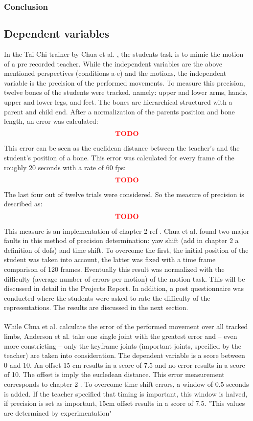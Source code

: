 \subsubsection{Conclusion}

\subsection{Dependent variables}
In the Tai Chi trainer by Chua et al. \cite{Chua}, the students task is to mimic the motion of a pre recorded teacher. While the independent variables are the above mentioned perspectives (conditions a-e) and the motions, the independent variable is the precision of the performed movements. To measure this precision, twelve bones of the students were tracked, namely: upper and lower arms, hands, upper and lower legs, and feet. The bones are hierarchical structured with a parent and child end. After a normalization of the parents position and bone length, an error was calculated:
\begin{equation}
	\textcolor{red}{\textbf{TODO}}
\end{equation}
This error can be seen as the euclidean distance between the teacher's and the student's position of a bone. This error was calculated for every frame of the roughly 20 seconds with a rate of 60 fps:
\begin{equation}
	\textcolor{red}{\textbf{TODO}}
\end{equation}
The last four out of twelve trials were considered. So the measure of precision is described as:
\begin{equation}
	\textcolor{red}{\textbf{TODO}}
\end{equation}
This measure is an implementation of chapter 2 ref \todo.
Chua et al. found two major faults in this method of precision determination: yaw shift (\todo add in chapter 2 a definition of dofs) and time shift. To overcome the first, the initial position of the student was taken into account, the latter was fixed with a time frame comparison of 120 frames. Eventually this result was normalized with the difficulty (average number of errors per motion) of the motion task. This will be discussed in detail in the Projects Report. In addition, a post questionnaire was conducted where the students were asked to rate the difficulty of the representations. The results are discussed in the next section.\\ \\
While Chua et al. calculate the error of the performed movement over all tracked limbs, Anderson et al. take one single joint with the greatest error and \--- even more constricting \--- only the keyframe joints (important joints, specified by the teacher) are taken into consideration. The dependent variable is a score between 0 and 10. An offset 15 cm results in a score of 7.5 and no error results in a score of 10. The offset is imply the eucledean distance. This error measurement corresponds to chapter 2 \todo. To overcome time shift errors, a window of 0.5 seconds is added. If the teacher specified that timing is important, this window is halved, if precision is set as important, 15cm offset results in a score of 7.5. "This values are determined by experimentation"

